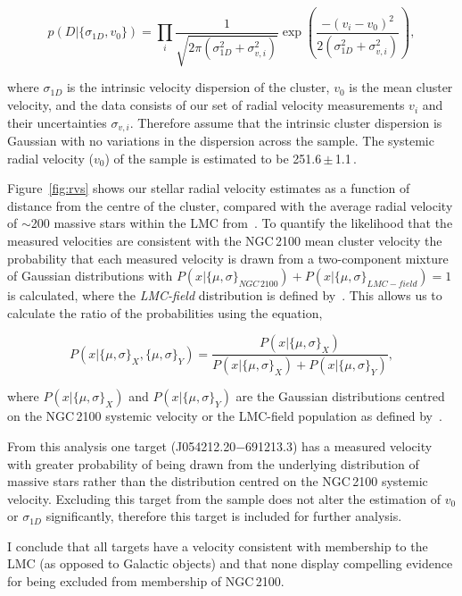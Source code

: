 \begin{equation}
p(D|\{\sigma_{1D}, v_0\}) = \prod_i \frac{1}{\sqrt{2 \pi (\sigma_{1D}^2+ \sigma_{v, i}^2)}}  \exp{\left(\frac{-(v_i - v_0)^2}{2 (\sigma_{1D}^2+ \sigma_{v, i}^2)}\right)},
\label{eq:like}
\end{equation}

\noindent where $\sigma_{1D}$ is the intrinsic velocity dispersion of the cluster, $v_0$ is the mean cluster velocity, and the data consists of our set of radial velocity measurements $v_i$ and their uncertainties $\sigma_{v, i}$. Therefore assume that the intrinsic cluster dispersion is Gaussian with no variations in the dispersion across the sample.
The systemic radial velocity ($v_0$) of the sample is estimated to be 251.6\,$\pm$\,1.1\,\kms.

Figure~\ref{fig:rvs} shows our stellar radial velocity estimates as a function of distance from the centre of the cluster, compared with the average radial velocity of $\sim$200 massive stars within the LMC from~\citet[][green dashed line]{2015A&A...584A...5E}.
To quantify the likelihood that the measured velocities are consistent with the NGC\,2100 mean cluster velocity the probability that each measured velocity is drawn from a two-component mixture of Gaussian distributions with
$P(x|\{\mu, \sigma\}_{NGC\,2100}) + P(x|\{\mu, \sigma\}_{LMC-field}) = 1$ is calculated,
where the {\it LMC-field} distribution is defined by~\cite{2015A&A...584A...5E}.
This allows us to calculate the ratio of the probabilities using the equation,

\begin{equation}
    P(x|\{\mu, \sigma\}_X,\{\mu, \sigma\}_Y) = \frac{P(x|\{\mu, \sigma\}_X)}{P(x|\{\mu, \sigma\}_X) + P(x|\{\mu, \sigma\}_Y)},
\end{equation}

where $P(x|\{\mu, \sigma\}_X)$ and $P(x|\{\mu, \sigma\}_Y)$ are the Gaussian distributions centred on the NGC\,2100 systemic velocity or the LMC-field population as defined by~\cite{2015A&A...584A...5E}.

From this analysis one target (J054212.20$-$691213.3) has a measured velocity with greater probability of being drawn from the underlying distribution of massive stars rather than the distribution centred on the NGC\,2100 systemic velocity.
Excluding this target from the sample does not alter the estimation of $v_0$ or $\sigma_{1D}$ significantly, therefore this target is included for further analysis.

I conclude that all targets have a velocity consistent with membership to the LMC (as opposed to Galactic objects) and that none display compelling evidence for being excluded from membership of NGC\,2100.


